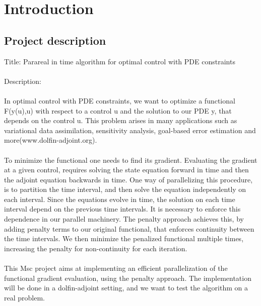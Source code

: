 \chapter{Introduction}
\section{Project description}
Title:
Parareal in time algorithm for optimal control with PDE constraints
\\
\\
Description:
\\
\\
In optimal control with PDE constraints, we want to optimize a functional F(y(u),u) with respect to a control u and the solution to our PDE y, that depends on the control u. This problem arises in many applications such as variational data assimilation, sensitivity analysis, goal-based error estimation and more(www.dolfin-adjoint.org).
\\
\\
To minimize the functional one needs to find its gradient. Evaluating the gradient at a given control, requires solving the state equation forward in time and then the adjoint equation backwards in time. One way of parallelizing this procedure, is to partition the time interval, and then solve the equation independently on each interval. Since the equations evolve in time, the solution on each time interval depend on the previous time intervals. It is necessary to enforce this dependence in our parallel machinery. The penalty approach achieves this, by adding penalty terms to our original functional, that enforces continuity between the time intervals. We then minimize the penalized functional multiple times, increasing the penalty for non-continuity for each iteration.
\\
\\
This Msc project aims at implementing an efficient parallelization of the functional gradient evaluation, using the penalty approach. The implementation will be done in a dolfin-adjoint setting, and we want to test the algorithm on a real problem.  